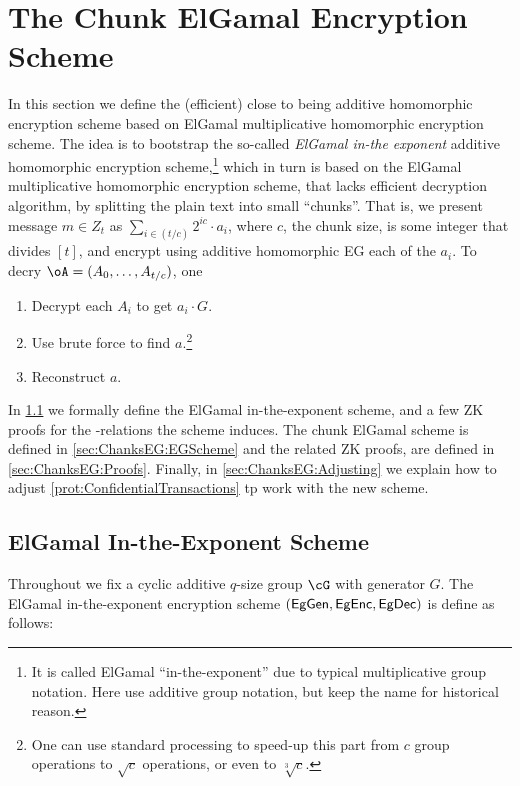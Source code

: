 \section{The Chunk ElGamal  Encryption Scheme}\label{sec:ChanksEG}
In this section we define the (efficient)  close to being additive homomorphic encryption scheme based on ElGamal multiplicative  homomorphic encryption scheme.  
The idea is to bootstrap the so-called   \textit{ElGamal in-the exponent}   additive homomorphic encryption  scheme,\footnote{It is called ElGamal ``in-the-exponent'' due to typical multiplicative group notation. Here use additive group notation, but keep the name for historical reason.}  which in turn is based on the  ElGamal multiplicative  homomorphic encryption scheme, that lacks efficient decryption algorithm, by splitting the plain text into small ``chunks''. That  is, we present message $m\in Z_t$ as $\sum_{i \in (t/c)}   2^{i c} \cdot a_i$, where $c$, the chunk size, is  some integer that divides $[t]$, and encrypt using    additive homomorphic EG each of the $a_i$. To decry $\oA= (A_0,\ldots,A_{t/c})$, one  
\begin{enumerate}
	\item Decrypt   each $A_i$ to get $a_i  \cdot G$.
	\item Use brute force to find $a$.\footnote{One can use standard   processing to speed-up this part from $c$ group operations to $\sqrt{c}$  operations, or even  to   $\sqrt[3]{c}$.}
	
	\item Reconstruct $a$.
\end{enumerate}
In \cref{sec:ChanksEG:EG} we formally define the ElGamal in-the-exponent scheme, and a few ZK proofs for the \NP-relations the scheme induces. The chunk ElGamal  scheme is defined in \cref{sec:ChanksEG:EGScheme} and the related ZK proofs, are defined in \cref{sec:ChanksEG:Proofs}. Finally, in \cref{sec:ChanksEG:Adjusting} we explain  how to adjust \cref{prot:ConfidentialTransactions} tp work with the new scheme.


\subsection{ElGamal In-the-Exponent Scheme}\label{sec:ChanksEG:EG}

Throughout we fix a cyclic  additive $q$-size group $\cG$ with generator $G$. The  ElGamal in-the-exponent encryption scheme $(\mathsf{EgGen},\mathsf{EgEnc},\mathsf{EgDec})$ is define as follows:

